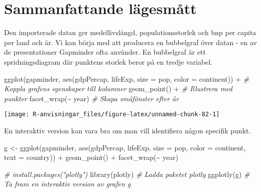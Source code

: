 \documentclass[
]{book}
\newenvironment{Shaded}{\begin{snugshade}}{\end{snugshade}}
\newcommand{\AttributeTok}[1]{\textcolor[rgb]{0.77,0.63,0.00}{#1}}
\newcommand{\CommentTok}[1]{\textcolor[rgb]{0.56,0.35,0.01}{\textit{#1}}}
\newcommand{\FunctionTok}[1]{\textcolor[rgb]{0.00,0.00,0.00}{#1}}
\newcommand{\NormalTok}[1]{#1}
\newcommand{\OtherTok}[1]{\textcolor[rgb]{0.56,0.35,0.01}{#1}}
\newcommand{\SpecialCharTok}[1]{\textcolor[rgb]{0.00,0.00,0.00}{#1}}
\theoremstyle{definition}
\theoremstyle{definition}
\theoremstyle{definition}
\theoremstyle{definition}
\theoremstyle{remark}
\begin{document}
\hypertarget{sammanfattande-luxe4gesmuxe5tt}{%
\section{Sammanfattande lägesmått}\label{sammanfattande-luxe4gesmuxe5tt}}

Den importerade datan ger medellivslängd, populationsstorlek och bnp per capita per land och år. Vi kan börja med att producera en bubbelgraf över datan - en av de presentationer Gapminder ofta använder. En bubbelgraf är ett spridningsdiagram där punktens storlek beror på en tredje variabel.

\begin{Shaded}
\begin{Highlighting}[]
\FunctionTok{ggplot}\NormalTok{(gapminder, }\FunctionTok{aes}\NormalTok{(gdpPercap, lifeExp, }\AttributeTok{size =}\NormalTok{ pop, }\AttributeTok{color =}\NormalTok{ continent)) }\SpecialCharTok{+}    \CommentTok{\# Koppla grafens egenskaper till kolumner}
  \FunctionTok{geom\_point}\NormalTok{() }\SpecialCharTok{+}                                                               \CommentTok{\# Illustrera med punkter}
  \FunctionTok{facet\_wrap}\NormalTok{(}\SpecialCharTok{\textasciitilde{}}\NormalTok{ year)                                                           }\CommentTok{\# Skapa småfönster efter år}
\end{Highlighting}
\end{Shaded}

\begin{center}\texttt{[image: R-anvisningar\_files/figure-latex/unnamed-chunk-82-1]} \end{center}

En interaktiv version kan vara bra om man vill identifiera någon specifik punkt.

\begin{Shaded}
\begin{Highlighting}[]
\NormalTok{g }\OtherTok{\textless{}{-}} \FunctionTok{ggplot}\NormalTok{(gapminder, }\FunctionTok{aes}\NormalTok{(gdpPercap, lifeExp, }\AttributeTok{size =}\NormalTok{ pop, }\AttributeTok{color =}\NormalTok{ continent, }\AttributeTok{text =}\NormalTok{ country)) }\SpecialCharTok{+}
  \FunctionTok{geom\_point}\NormalTok{() }\SpecialCharTok{+}
  \FunctionTok{facet\_wrap}\NormalTok{(}\SpecialCharTok{\textasciitilde{}}\NormalTok{ year)}

\CommentTok{\# install.packages("plotly")}
\FunctionTok{library}\NormalTok{(plotly)                        }\CommentTok{\# Ladda paketet plotly}
\FunctionTok{ggplotly}\NormalTok{(g)                            }\CommentTok{\# Ta fram en interaktiv version av grafen g}
\end{Highlighting}
\end{Shaded}
\end{document}
